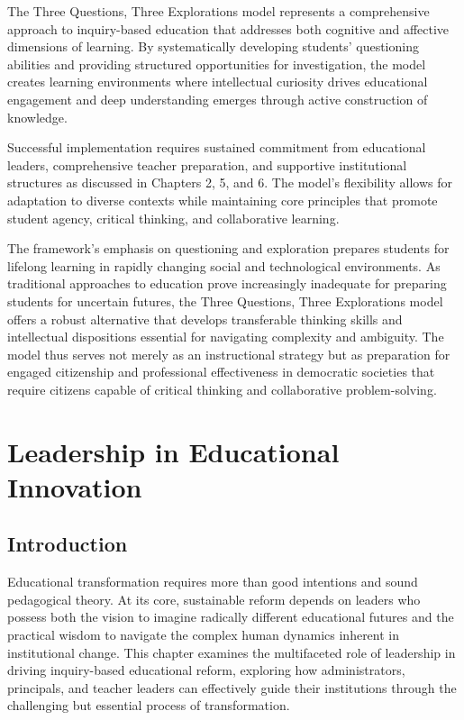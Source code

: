 \documentclass[
  Letterpaper,
]{scrbook}
\begin{document}
The Three Questions, Three Explorations model represents a comprehensive
approach to inquiry-based education that addresses both cognitive and
affective dimensions of learning. By systematically developing students'
questioning abilities and providing structured opportunities for
investigation, the model creates learning environments where
intellectual curiosity drives educational engagement and deep
understanding emerges through active construction of knowledge.

Successful implementation requires sustained commitment from educational
leaders, comprehensive teacher preparation, and supportive institutional
structures as discussed in Chapters 2, 5, and 6. The model's flexibility
allows for adaptation to diverse contexts while maintaining core
principles that promote student agency, critical thinking, and
collaborative learning.

The framework's emphasis on questioning and exploration prepares
students for lifelong learning in rapidly changing social and
technological environments. As traditional approaches to education prove
increasingly inadequate for preparing students for uncertain futures,
the Three Questions, Three Explorations model offers a robust
alternative that develops transferable thinking skills and intellectual
dispositions essential for navigating complexity and ambiguity. The
model thus serves not merely as an instructional strategy but as
preparation for engaged citizenship and professional effectiveness in
democratic societies that require citizens capable of critical thinking
and collaborative problem-solving.


\chapter{Leadership in Educational
Innovation}\label{leadership-in-educational-innovation}

\section{Introduction}\label{introduction-3}

Educational transformation requires more than good intentions and sound
pedagogical theory. At its core, sustainable reform depends on leaders
who possess both the vision to imagine radically different educational
futures and the practical wisdom to navigate the complex human dynamics
inherent in institutional change. This chapter examines the multifaceted
role of leadership in driving inquiry-based educational reform,
exploring how administrators, principals, and teacher leaders can
effectively guide their institutions through the challenging but
essential process of transformation.
\end{document}
